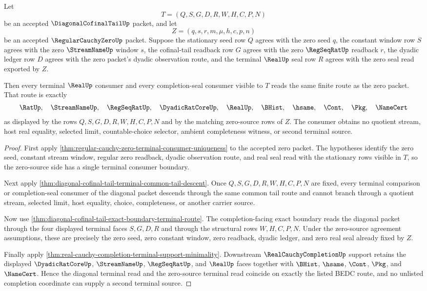 \begin{theorem}
\label{thm:diagonal-cofinal-tail-zero-source-terminal-coincidence}
Let
$$
T=(Q,S,G,D,R,W,H,C,P,N)
$$
be an accepted $\DiagonalCofinalTailUp$ packet, and let
$$
Z=(q,s,r,m,\mu,h,c,p,n)
$$
be an accepted $\RegularCauchyZeroUp$ packet. Suppose the stationary seed row $Q$ agrees with the zero seed $q$, the constant window row $S$ agrees with the zero $\StreamNameUp$ window $s$, the cofinal-tail readback row $G$ agrees with the zero $\RegSeqRatUp$ readback $r$, the dyadic ledger row $D$ agrees with the zero packet's dyadic observation route, and the terminal $\RealUp$ seal row $R$ agrees with the zero seal read exported by $Z$.

Then every terminal $\RealUp$ consumer and every completion-seal consumer visible to $T$ reads the same finite route as the zero packet. That route is exactly
$$
\RatUp,\quad \StreamNameUp,\quad \RegSeqRatUp,\quad \DyadicRatCoreUp,\quad \RealUp,\quad \BHist,\quad \hsame,\quad \Cont,\quad \Pkg,\quad \NameCert
$$
as displayed by the rows $Q,S,G,D,R,W,H,C,P,N$ and by the matching zero-source rows of $Z$. The consumer obtains no quotient stream, host real equality, selected limit, countable-choice selector, ambient completeness witness, or second terminal source.
\end{theorem}
\begin{proof}
First apply \autoref{thm:regular-cauchy-zero-terminal-consumer-uniqueness} to the accepted zero packet. The hypotheses identify the zero seed, constant stream window, regular zero readback, dyadic observation route, and real seal read with the stationary rows visible in $T$, so the zero-source side has a single terminal consumer boundary.

Next apply \autoref{thm:diagonal-cofinal-tail-terminal-common-tail-descent}. Once $Q,S,G,D,R,W,H,C,P,N$ are fixed, every terminal comparison or completion-seal consumer of the diagonal packet descends through the same common tail route and cannot branch through a quotient stream, selected limit, host equality, choice, completeness, or another carrier source.

Now use \autoref{thm:diagonal-cofinal-tail-exact-boundary-terminal-route}. The completion-facing exact boundary reads the diagonal packet through the four displayed terminal faces $S,G,D,R$ and through the structural rows $W,H,C,P,N$. Under the zero-source agreement assumptions, these are precisely the zero seed, zero constant window, zero readback, dyadic ledger, and zero real seal already fixed by $Z$.

Finally apply \autoref{thm:real-cauchy-completion-terminal-support-minimality}. Downstream $\RealCauchyCompletionUp$ support retains the displayed $\DyadicRatCoreUp$, $\StreamNameUp$, $\RegSeqRatUp$, and $\RealUp$ faces together with $\BHist$, $\hsame$, $\Cont$, $\Pkg$, and $\NameCert$. Hence the diagonal terminal read and the zero-source terminal read coincide on exactly the listed BEDC route, and no unlisted completion coordinate can supply a second terminal source.
\end{proof}

